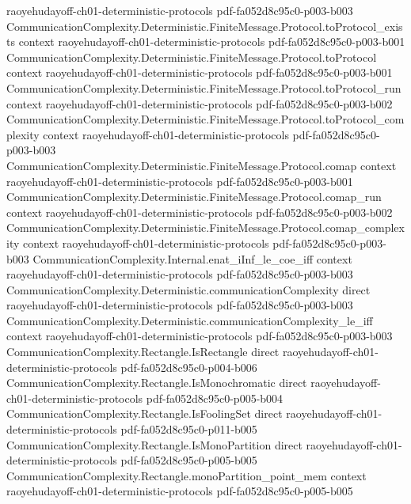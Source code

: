 \begin{theorem}
  {raoyehudayoff-ch01-deterministic-protocols}
  {pdf-fa052d8c95c0-p003-b003}
\proofstep
  {CommunicationComplexity.Deterministic.FiniteMessage.Protocol.toProtocol_exists}
  {context}
  {raoyehudayoff-ch01-deterministic-protocols}
  {pdf-fa052d8c95c0-p003-b001}
\proofstep
  {CommunicationComplexity.Deterministic.FiniteMessage.Protocol.toProtocol}
  {context}
  {raoyehudayoff-ch01-deterministic-protocols}
  {pdf-fa052d8c95c0-p003-b001}
\proofstep
  {CommunicationComplexity.Deterministic.FiniteMessage.Protocol.toProtocol_run}
  {context}
  {raoyehudayoff-ch01-deterministic-protocols}
  {pdf-fa052d8c95c0-p003-b002}
\proofstep
  {CommunicationComplexity.Deterministic.FiniteMessage.Protocol.toProtocol_complexity}
  {context}
  {raoyehudayoff-ch01-deterministic-protocols}
  {pdf-fa052d8c95c0-p003-b003}
\proofstep
  {CommunicationComplexity.Deterministic.FiniteMessage.Protocol.comap}
  {context}
  {raoyehudayoff-ch01-deterministic-protocols}
  {pdf-fa052d8c95c0-p003-b001}
\proofstep
  {CommunicationComplexity.Deterministic.FiniteMessage.Protocol.comap_run}
  {context}
  {raoyehudayoff-ch01-deterministic-protocols}
  {pdf-fa052d8c95c0-p003-b002}
\proofstep
  {CommunicationComplexity.Deterministic.FiniteMessage.Protocol.comap_complexity}
  {context}
  {raoyehudayoff-ch01-deterministic-protocols}
  {pdf-fa052d8c95c0-p003-b003}
\proofstep
  {CommunicationComplexity.Internal.enat_iInf_le_coe_iff}
  {context}
  {raoyehudayoff-ch01-deterministic-protocols}
  {pdf-fa052d8c95c0-p003-b003}
\proofstep
  {CommunicationComplexity.Deterministic.communicationComplexity}
  {direct}
  {raoyehudayoff-ch01-deterministic-protocols}
  {pdf-fa052d8c95c0-p003-b003}
\proofstep
  {CommunicationComplexity.Deterministic.communicationComplexity_le_iff}
  {context}
  {raoyehudayoff-ch01-deterministic-protocols}
  {pdf-fa052d8c95c0-p003-b003}
\proofstep
  {CommunicationComplexity.Rectangle.IsRectangle}
  {direct}
  {raoyehudayoff-ch01-deterministic-protocols}
  {pdf-fa052d8c95c0-p004-b006}
\proofstep
  {CommunicationComplexity.Rectangle.IsMonochromatic}
  {direct}
  {raoyehudayoff-ch01-deterministic-protocols}
  {pdf-fa052d8c95c0-p005-b004}
\proofstep
  {CommunicationComplexity.Rectangle.IsFoolingSet}
  {direct}
  {raoyehudayoff-ch01-deterministic-protocols}
  {pdf-fa052d8c95c0-p011-b005}
\proofstep
  {CommunicationComplexity.Rectangle.IsMonoPartition}
  {direct}
  {raoyehudayoff-ch01-deterministic-protocols}
  {pdf-fa052d8c95c0-p005-b005}
\proofstep
  {CommunicationComplexity.Rectangle.monoPartition_point_mem}
  {context}
  {raoyehudayoff-ch01-deterministic-protocols}
  {pdf-fa052d8c95c0-p005-b005}

\end{theorem}
